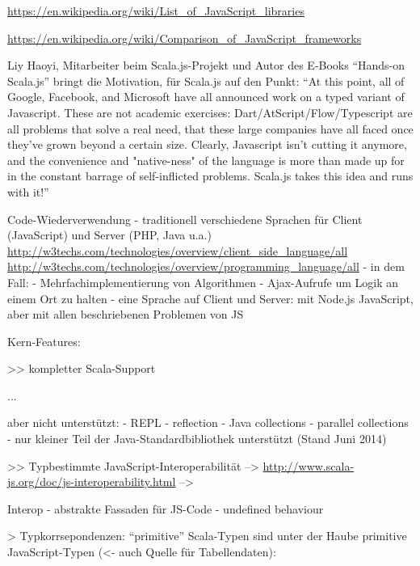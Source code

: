 \documentclass[a4paper, 12pt, listof=totoc, bibliography=totoc]{scrreprt}
\begin{document}
\url{https://en.wikipedia.org/wiki/List_of_JavaScript_libraries}

\url{https://en.wikipedia.org/wiki/Comparison_of_JavaScript_frameworks}


Liy Haoyi, Mitarbeiter beim Scala.js-Projekt und Autor des E-Books "`Hands-on Scala.js"' bringt die Motivation, für Scala.js auf den Punkt: "`At this point, all of Google, Facebook, and Microsoft have all announced work on a typed variant of Javascript. These are not academic exercises: Dart/AtScript/Flow/Typescript are all problems that solve a real need, that these large companies have all faced once they've grown beyond a certain size. Clearly, Javascript isn't cutting it anymore, and the convenience and "native-ness" of the language is more than made up for in the constant barrage of self-inflicted problems. Scala.js takes this idea and runs with it!"'\cite{haoyi.HOS}


Code-Wiederverwendung
- traditionell verschiedene Sprachen für Client (JavaScript) und Server (PHP, Java u.a.)
	\url{http://w3techs.com/technologies/overview/client_side_language/all}
	\url{http://w3techs.com/technologies/overview/programming_language/all}
	- in dem Fall:
		- Mehrfachimplementierung von Algorithmen
		- Ajax-Aufrufe um Logik an einem Ort zu halten
- eine Sprache auf Client und Server: mit Node.js JavaScript, aber mit allen beschriebenen Problemen von JS






Kern-Features:

>> kompletter Scala-Support

...

aber nicht unterstützt:
- REPL
- reflection
- Java collections
- parallel collections
\cite{doeraene2013.CSJ}
- nur kleiner Teil der Java-Standardbibliothek unterstützt (Stand Juni 2014)\cite{doeraene2014.WHB}


>> Typbestimmte JavaScript-Interoperabilität
-->  \url{http://www.scala-js.org/doc/js-interoperability.html}
-->  \cite{doeraene2013.TDI}

Interop
- abstrakte Fassaden für JS-Code
- undefined behaviour


> Typkorrsepondenzen: "`primitive"' Scala-Typen sind unter der Haube primitive JavaScript-Typen\cite{doeraene2014.WHB} (<- auch Quelle für Tabellendaten):

\medskip
\end{document}

